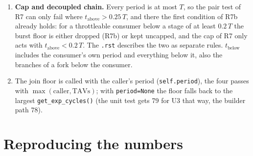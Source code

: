 \documentclass[10pt,a4paper]{article}
\newcommand{\code}[1]{\texttt{#1}}
\newcommand{\Tg}{T}           %
\begin{document}
\begin{enumerate}
  says fork and join vectors ``are copied from their neighbours''; the \code{.rst} states that
  this rule (\code{inherited\_fork\_join\_tav\_lengths}) was removed, and the code agrees.
\item \textbf{Cap and decoupled chain.} Every period is at most $\Tg$, so the pair test of
  R7 can only fail where $t_{\mathrm{above}}>0.25\,\Tg$, and there the first condition of
  R7b already holds: for a throttleable consumer below a stage of at least $0.2\,\Tg$ the
  burst floor is either dropped (R7b) or kept uncapped, and the cap of R7 only acts with
  $t_{\mathrm{above}}<0.2\,\Tg$. The \code{.rst} describes the two as separate rules.
  $t_{\mathrm{below}}$ includes the consumer's own period and everything below it, also
  the branches of a fork below the consumer.
\item The join floor is called with the caller's period (\code{self.period}), the four
  passes with $\max(\text{caller},\text{TAVs})$; with \code{period=None} the floor falls back to
  the largest \code{get\_exp\_cycles()} (the unit test gets 79 for U3 that way, the builder path 78).
\end{enumerate}

\appendix
\section{Reproducing the numbers}\label{app:repro}
\end{document}
